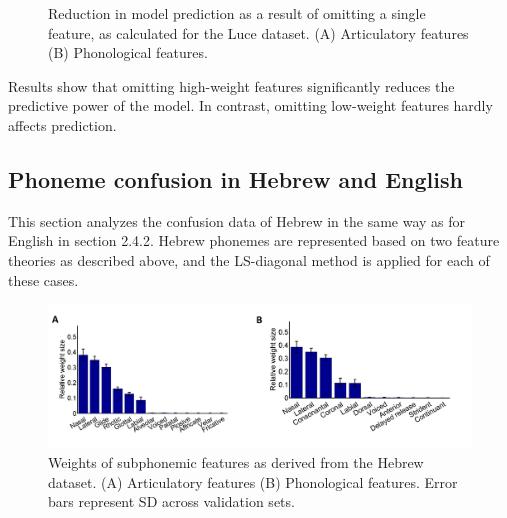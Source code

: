 \begin{figure}
\vspace{.3in}
\caption{Reduction in model prediction as a result of omitting a single feature, as calculated for the Luce dataset. (A) Articulatory features (B) Phonological features.}
\end{figure}

Results show that omitting high-weight features significantly reduces the predictive power of the model. In contrast, omitting low-weight features hardly affects prediction.

\subsection{Phoneme confusion in Hebrew and English}
This section analyzes the confusion data of Hebrew in the same way as for English in section 2.4.2. Hebrew phonemes are represented based on two feature theories as described above, and the LS-diagonal method is applied for each of these cases.

\begin{figure}[t]
\vspace{.3in}
\includegraphics[width=\linewidth]{Figures/Ch2/weight_Heb.PNG}
\caption{Weights of subphonemic features as derived from the Hebrew dataset. (A) Articulatory features (B) Phonological features. Error bars represent SD across validation sets.}
\end{figure}

